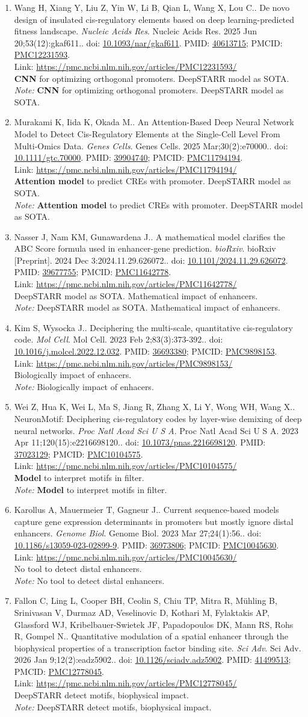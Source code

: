 \documentclass[12pt]{article}
\newcommand{\Pub}[9]{%
  \item #1. #2. \textit{#3}. #4. doi: \href{https://doi.org/#5}{#5}. PMID: \href{https://pubmed.ncbi.nlm.nih.gov/#6/}{#6}; PMCID: \href{https://www.ncbi.nlm.nih.gov/pmc/articles/#7/}{#7}. \\
  \noindent Link: \url{#8}\\
  \ifx#9\relax\else\\\textit{Note:} #9\fi
}
\begin{document}
\begin{enumerate}[leftmargin=*,label=\textbf{\arabic*.}]
\newpage

\Pub{Wang H, Xiang Y, Liu Z, Yin W, Li B, Qian L, Wang X, Lou C.}{De novo design of insulated cis-regulatory elements based on deep learning-predicted fitness landscape}{Nucleic Acids Res}{Nucleic Acids Res. 2025 Jun 20;53(12):gkaf611.}{10.1093/nar/gkaf611}{40613715}{PMC12231593}{https://pmc.ncbi.nlm.nih.gov/articles/PMC12231593/}{\textbf{CNN} for optimizing orthogonal promoters. DeepSTARR model as SOTA.}

\Pub{Murakami K, Iida K, Okada M.}{An Attention-Based Deep Neural Network Model to Detect Cis-Regulatory Elements at the Single-Cell Level From Multi-Omics Data}{Genes Cells}{Genes Cells. 2025 Mar;30(2):e70000.}{10.1111/gtc.70000}{39904740}{PMC11794194}{https://pmc.ncbi.nlm.nih.gov/articles/PMC11794194/}{\textbf{Attention model} to predict CREs with promoter. DeepSTARR model as SOTA.}

\Pub{Nasser J, Nam KM, Gunawardena J.}{A mathematical model clarifies the ABC Score formula used in enhancer-gene prediction}{bioRxiv}{bioRxiv [Preprint]. 2024 Dec 3:2024.11.29.626072.}{10.1101/2024.11.29.626072}{39677755}{PMC11642778}{https://pmc.ncbi.nlm.nih.gov/articles/PMC11642778/}{DeepSTARR model as SOTA. Mathematical impact of enhancers.}

\Pub{Kim S, Wysocka J.}{Deciphering the multi-scale, quantitative cis-regulatory code}{Mol Cell}{Mol Cell. 2023 Feb 2;83(3):373-392.}{10.1016/j.molcel.2022.12.032}{36693380}{PMC9898153}{https://pmc.ncbi.nlm.nih.gov/articles/PMC9898153/}{Biologically impact of enhacers.}

\Pub{Wei Z, Hua K, Wei L, Ma S, Jiang R, Zhang X, Li Y, Wong WH, Wang X.}{NeuronMotif: Deciphering cis-regulatory codes by layer-wise demixing of deep neural networks}{Proc Natl Acad Sci U S A}{Proc Natl Acad Sci U S A. 2023 Apr 11;120(15):e2216698120.}{10.1073/pnas.2216698120}{37023129}{PMC10104575}{https://pmc.ncbi.nlm.nih.gov/articles/PMC10104575/}{\textbf{Model} to interpret motifs in filter.}

\Pub{Karollus A, Mauermeier T, Gagneur J.}{Current sequence-based models capture gene expression determinants in promoters but mostly ignore distal enhancers}{Genome Biol}{Genome Biol. 2023 Mar 27;24(1):56.}{10.1186/s13059-023-02899-9}{36973806}{PMC10045630}{https://pmc.ncbi.nlm.nih.gov/articles/PMC10045630/}{No tool to detect distal enhancers.}

\Pub{Fallon C, Ling L, Cooper BH, Ceolin S, Chiu TP, Mitra R, Mühling B, Srinivasan V, Durmaz AD, Veselinovic D, Kothari M, Fylaktakis AP, Glassford WJ, Kribelbauer-Swietek JF, Papadopoulos DK, Mann RS, Rohs R, Gompel N.}{Quantitative modulation of a spatial enhancer through the biophysical properties of a transcription factor binding site}{Sci Adv}{Sci Adv. 2026 Jan 9;12(2):eadz5902.}{10.1126/sciadv.adz5902}{41499513}{PMC12778045}{https://pmc.ncbi.nlm.nih.gov/articles/PMC12778045/}{DeepSTARR detect motifs, biophysical impact.}


\end{enumerate}
\end{document}
